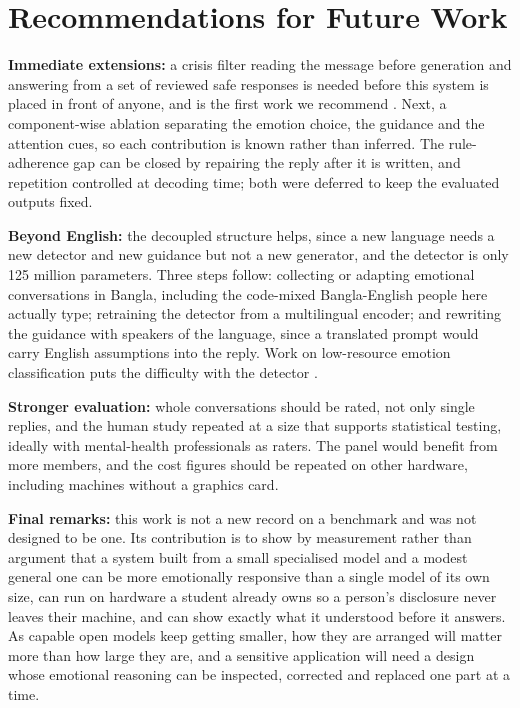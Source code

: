\section{Recommendations for Future Work}
\label{sec:6.4}

\textbf{Immediate extensions:} a crisis filter reading the message before generation and answering from a set of reviewed safe responses is needed before this system is placed in front of anyone, and is the first work we recommend \cite{who2023suicide}. Next, a component-wise ablation separating the emotion choice, the guidance and the attention cues, so each contribution is known rather than inferred. The rule-adherence gap can be closed by repairing the reply after it is written, and repetition controlled at decoding time; both were deferred to keep the evaluated outputs fixed.

\textbf{Beyond English:} the decoupled structure helps, since a new language needs a new detector and new guidance but not a new generator, and the detector is only 125 million parameters. Three steps follow: collecting or adapting emotional conversations in Bangla, including the code-mixed Bangla-English people here actually type; retraining the detector from a multilingual encoder; and rewriting the guidance with speakers of the language, since a translated prompt would carry English assumptions into the reply. Work on low-resource emotion classification puts the difficulty with the detector \cite{belay2025}.

\textbf{Stronger evaluation:} whole conversations should be rated, not only single replies, and the human study repeated at a size that supports statistical testing, ideally with mental-health professionals as raters. The panel would benefit from more members, and the cost figures should be repeated on other hardware, including machines without a graphics card.

\textbf{Final remarks:} this work is not a new record on a benchmark and was not designed to be one. Its contribution is to show by measurement rather than argument that a system built from a small specialised model and a modest general one can be more emotionally responsive than a single model of its own size, can run on hardware a student already owns so a person's disclosure never leaves their machine, and can show exactly what it understood before it answers. As capable open models keep getting smaller, how they are arranged will matter more than how large they are, and a sensitive application will need a design whose emotional reasoning can be inspected, corrected and replaced one part at a time.
